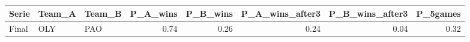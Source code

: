 \begin{table}[ht]
\centering
\begin{tabular}{lllrrrrr}
  \hline
Serie & Team\_A & Team\_B & P\_A\_wins & P\_B\_wins & P\_A\_wins\_after3 & P\_B\_wins\_after3 & P\_5games \\ 
  \hline
Final & OLY & PAO & 0.74 & 0.26 & 0.24 & 0.04 & 0.32 \\ 
   \hline
\end{tabular}
\end{table}
